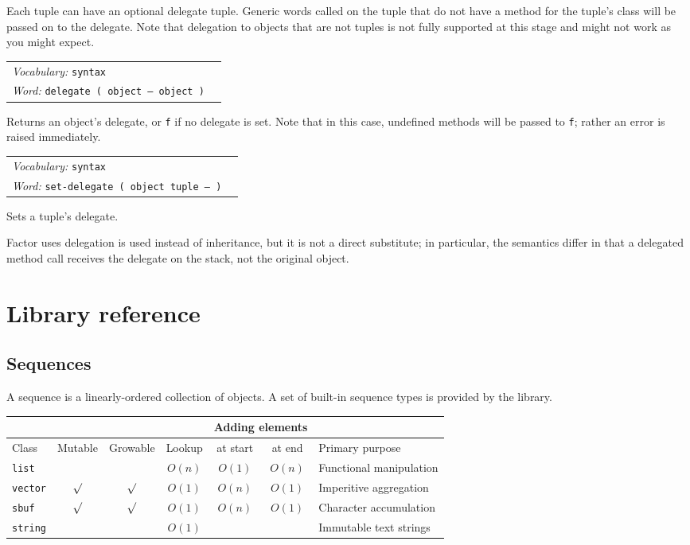 \documentclass{book}
\newcommand{\vocabulary}[1]{\emph{Vocabulary:} \texttt{#1}&\\}
\newcommand{\ordinaryword}[2]{\index{\texttt{#1}}\emph{Word:} \texttt{#2}&\\}
\newcommand{\wordtable}[1]{


\begin{tabularx}{12cm}{lX}
\hline
#1
\hline
\end{tabularx}

}
\begin{document}

Each tuple can have an optional delegate tuple. Generic words called on
the tuple that do not have a method for the tuple's class will be passed on
to the delegate. Note that delegation to objects that are not tuples is not fully supported at this stage and might not work as you might expect.
\wordtable{
\vocabulary{syntax}
\ordinaryword{delegate}{delegate ( object -- object )}

}
Returns an object's delegate, or \texttt{f} if no delegate is set. Note that in this case,  undefined methods will be passed to \texttt{f}; rather an error is raised immediately.
\wordtable{
\vocabulary{syntax}
\ordinaryword{set-delegate}{set-delegate ( object tuple -- )}

}
Sets a tuple's delegate.

Factor uses delegation is used instead of inheritance, but it is not a direct
substitute; in particular, the semantics differ in that a delegated
method call receives the delegate on the stack, not the original object.

\chapter{Library reference}

\section{Sequences}

A sequence is a linearly-ordered collection of objects. A set of built-in sequence types  is provided by the library.

\begin{tabular}[t]{l|c|c|c|c|c|l}
\multicolumn{4}{l|}{}&\multicolumn{2}{c|}{Adding elements}&\multicolumn{1}{l}{}\\
\hline
Class&Mutable&Growable&Lookup&at start&at end&Primary purpose\\
\hline
\texttt{list}&&&$O(n)$&$O(1)$&$O(n)$&Functional manipulation\\
\texttt{vector}&$\surd$&$\surd$&$O(1)$&$O(n)$&$O(1)$&Imperitive aggregation\\
\texttt{sbuf}&$\surd$&$\surd$&$O(1)$&$O(n)$&$O(1)$&Character accumulation\\
\texttt{string}&&&$O(1)$&&&Immutable text strings
\end{tabular}
\end{document}
